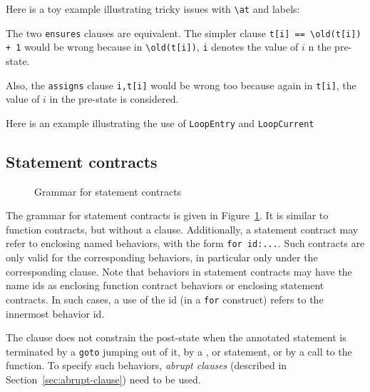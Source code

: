 \begin{example}
  Here is a toy example illustrating tricky issues with \lstinline|\at| and
  labels:


  The two \lstinline|ensures| clauses are equivalent. The simpler clause
  \lstinline|t[i] == \old(t[i]) + 1| would be wrong because in
  \lstinline|\old(t[i])|, \lstinline|i| denotes the value of $i$ n the
  pre-state.

  Also, the \lstinline|assigns| clause \lstinline|i,t[i]| would be
  wrong too because again in \lstinline|t[i]|, the value of $i$ in the
  pre-state is considered.

\end{example}

\begin{example}
Here is an example illustrating the use of \lstinline|LoopEntry| and
\lstinline|LoopCurrent|

\end{example}

\subsection{Statement contracts}
\label{sec:statement_contract}
\begin{figure}[t]
  \begin{cadre}
    
  \end{cadre}
  \caption{Grammar for statement contracts}
  \label{fig:gram:stcontracts}
\end{figure}

The grammar for statement contracts is given in
Figure~\ref{fig:gram:stcontracts}. It is similar to function
contracts, but without a \decreases{} clause. Additionally, a statement contract
may refer to enclosing named behaviors, with the form
\lstinline|for id:...|.
Such contracts are only valid for the
corresponding behaviors, in particular only under the
corresponding \assumes{} clause.
Note that behaviors in statement contracts may have the name ids as enclosing function contract behaviors
or enclosing statement contracts.
In such cases, a use of the id (in a \lstinline|for| construct) refers to the innermost behavior id.


The \ensures{} clause does not constrain the
post-state when the annotated statement is terminated 
by a \lstinline|goto| jumping out of it,
by a \Break{}, \Continue{} or \Return{} statement,
or by a call to the \exit{} function.
To specify such behaviors, \textsl{abrupt clauses} (described in
Section~\ref{sec:abrupt-clause}) need to be used.

